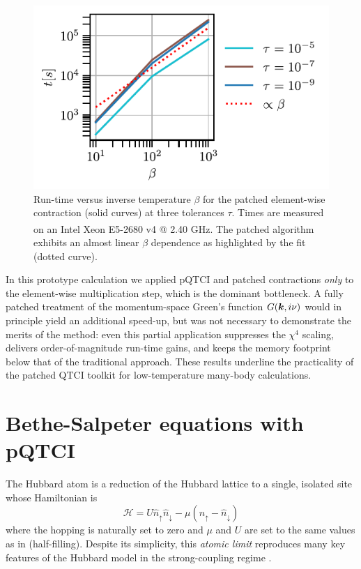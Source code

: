\begin{figure}[htpb]
    \centering
    \includegraphics{figures/betaScalingBubble.pdf}
    \caption{Run-time versus inverse temperature \(\beta\) for the patched
    element-wise contraction (solid curves) at three tolerances \(\tau\). Times are measured on an Intel\textsuperscript{\textregistered} Xeon\textsuperscript{\textregistered} E5-2680 v4 @ 2.40 GHz.  The patched algorithm exhibits an almost linear \(\beta\) dependence as highlighted by the fit (dotted curve).}
    \label{fig:betaScaling}
\end{figure}

In this prototype calculation we applied pQTCI and patched contractions \emph{only} to the element-wise multiplication step, which is the dominant bottleneck.
A fully patched treatment of the momentum-space Green’s function \(G(\boldsymbol{k},i\nu)\) would in principle yield an additional speed-up, but was not necessary to demonstrate the merits of the method: even this partial application suppresses the \(\chi^{4}\) scaling, delivers
order-of-magnitude run-time gains, and keeps the memory footprint below that of the traditional approach. These results underline the practicality of the patched QTCI
toolkit for low-temperature many-body calculations.

\section{Bethe-Salpeter equations with pQTCI} 
\label{sec:patchBSE}
The Hubbard atom is a reduction of the Hubbard lattice to a single, isolated site whose Hamiltonian is
\begin{equation}
    \mathcal{H} = U\hat{n}_{\uparrow}\hat{n}_{\downarrow} - \mu(\hat{n}_{\uparrow} - \hat{n}_{\downarrow})
\end{equation}
where the hopping is naturally set to zero and $\mu$ and $U$ are set to the same values as in  (half-filling). Despite its simplicity, this \emph{atomic limit} reproduces many key features of the Hubbard model in the strong-coupling regime \cite{Thunstrom2018}.

